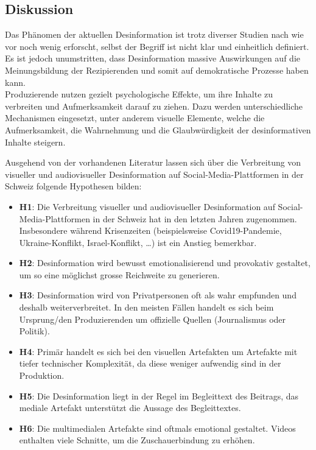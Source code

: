 \documentclass[12pt,a4paper]{article}        %
\begin{document}
\subsection{Diskussion}
Das Phänomen der aktuellen Desinformation ist trotz diverser Studien nach wie vor noch wenig erforscht, selbst der Begriff ist nicht klar und einheitlich definiert. Es ist jedoch unumstritten, dass Desinformation massive Auswirkungen auf die Meinungsbildung der Rezipierenden und somit auf demokratische Prozesse haben kann. \\
Produzierende nutzen gezielt psychologische Effekte, um ihre Inhalte zu verbreiten und Aufmerksamkeit darauf zu ziehen. Dazu werden unterschiedliche Mechanismen eingesetzt, unter anderem visuelle Elemente, welche die Aufmerksamkeit, die Wahrnehmung und die Glaubwürdigkeit der desinformativen Inhalte steigern.

Ausgehend von der vorhandenen Literatur lassen sich über die Verbreitung von visueller und audiovisueller Desinformation auf Social-Media-Plattformen in der Schweiz folgende Hypothesen bilden:
\begin{itemize}
    \item \textbf{H1}: Die Verbreitung visueller und audiovisueller Desinformation auf Social-Media-Plattformen in der Schweiz hat in den letzten Jahren zugenommen. Insbesondere während Krisenzeiten (beispielsweise Covid19-Pandemie, Ukraine-Konflikt, Israel-Konflikt, \ldots) ist ein Anstieg bemerkbar.
    \item \textbf{H2}: Desinformation wird bewusst emotionalisierend und provokativ gestaltet, um so eine möglichst grosse Reichweite zu generieren.
    \item \textbf{H3}: Desinformation wird von Privatpersonen oft als wahr empfunden und deshalb weiterverbreitet. In den meisten Fällen handelt es sich beim Ursprung/den Produzierenden um offizielle Quellen (Journalismus oder Politik).
    \item \textbf{H4}: Primär handelt es sich bei den visuellen Artefakten um Artefakte mit tiefer technischer Komplexität, da diese weniger aufwendig sind in der Produktion.
    \item \textbf{H5}: Die Desinformation liegt in der Regel im Begleittext des Beitrags, das mediale Artefakt unterstützt die Aussage des Begleittextes.
    \item \textbf{H6}: Die multimedialen Artefakte sind oftmals emotional gestaltet. Videos enthalten viele Schnitte, um die Zuschauerbindung zu erhöhen.
\end{itemize}
\end{document}
